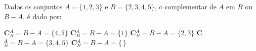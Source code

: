 Dados os conjuntos $A=\{1,2,3\}$ e $B=\{2,3,4,5\}$, o complementar de $A$ em $B$ ou $B-A$, é dado por:

{\bf C}$_B^A=B-A=\{4,5\}$
{\bf C}$_B^A=B-A=\{1\}$
{\bf C}$_B^A=B-A=\{2,3\}$
{\bf C}$_B^A=B-A=\{3,4,5\}$
{\bf C}$_B^A=B-A=\{\,\}$







